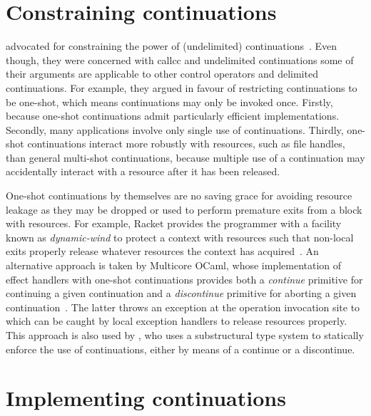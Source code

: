 \documentclass[12pt,phd,lfcs,twoside,openright,logo,leftchapter,normalheadings]{infthesis}
\theoremstyle{plain}
\theoremstyle{definition}
\begin{document}
\section{Constraining continuations}
\label{sec:constraining-continuations}

\citet{FriedmanH85} advocated for constraining the power of
(undelimited) continuations~\cite{HaynesF87}.
%
Even though, they were concerned with callcc and undelimited
continuations some of their arguments are applicable to other control
operators and delimited continuations.
%
For example, they argued in favour of restricting continuations to be
one-shot, which means continuations may only be invoked once. Firstly,
because one-shot continuations admit particularly efficient
implementations. Secondly, many applications involve only single use
of continuations. Thirdly, one-shot continuations interact more
robustly with resources, such as file handles, than general multi-shot
continuations, because multiple use of a continuation may accidentally
interact with a resource after it has been released.

One-shot continuations by themselves are no saving grace for avoiding
resource leakage as they may be dropped or used to perform premature
exits from a block with resources. For example, Racket provides the
programmer with a facility known as \emph{dynamic-wind} to protect a
context with resources such that non-local exits properly release
whatever resources the context has acquired~\cite{Flatt20}.
%
An alternative approach is taken by Multicore OCaml, whose
implementation of effect handlers with one-shot continuations provides
both a \emph{continue} primitive for continuing a given continuation
and a \emph{discontinue} primitive for aborting a given
continuation~\cite{DolanWSYM15,DolanEHMSW17}. The latter throws an
exception at the operation invocation site to which can be caught by
local exception handlers to release resources properly.
%
This approach is also used by \citet{Fowler19}, who uses a
substructural type system to statically enforce the use of
continuations, either by means of a continue or a discontinue.


\section{Implementing continuations}
\label{sec:implementing-continuations}
\end{document}
